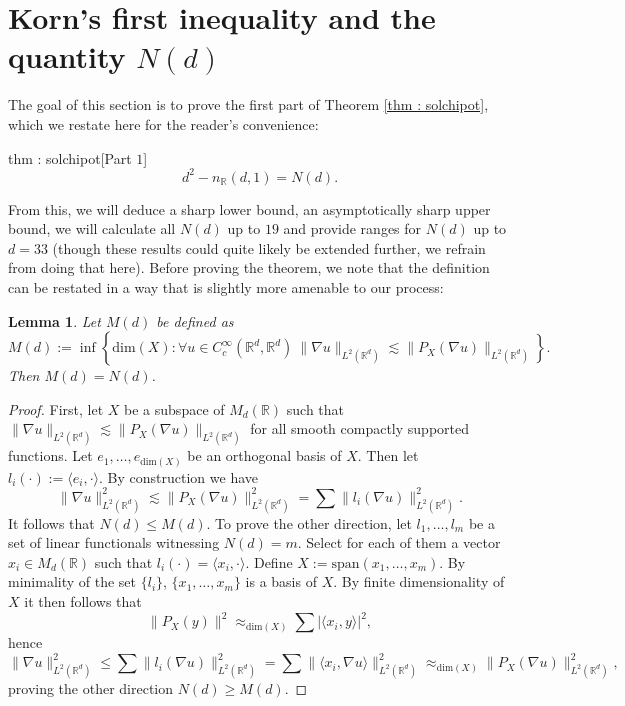 \documentclass[11pt, a4paper, reqno]{elsarticle}
\newtheorem{lemma}[theorem]{Lemma}
\theoremstyle{definition}
\theoremstyle{remark}
\begin{document}
\section{Korn's first inequality and the quantity \texorpdfstring{$N(d)$}{N(d)}}\label{sec : Chipot}
The goal of this section is to prove the first part of Theorem \ref{thm : solchipot},
which we restate here for the reader's convenience:
\begin{reptheorem}{thm : solchipot}[Part $1$]
\begin{equation}
	d^2
-
	n_{\mathbb R}(d,1)
=
	N(d).
\end{equation}
\end{reptheorem}
From this, we will deduce a sharp lower bound, an asymptotically 
sharp upper bound, we will calculate all 
$N(d)$ up to $19$ and provide ranges for $N(d)$ up to $d=33$ 
(though these results could quite likely be extended further, we
refrain from doing that here).
Before proving the theorem, we note that the
definition can be restated in a way that is slightly
more amenable to our process:
\begin{lemma}
Let $M(d)$ be defined as
\begin{equation*}
	M(d)
:=
	\inf 
	\left\{
		\mathrm{dim}(X)\colon  \forall u\in C^\infty_c(\mathbb{R}^d,\mathbb{R}^d)\  
		\|\nabla u\|_{L^2(\mathbb{R}^d)}
	\lesssim
		\| P_X(\nabla u)\|_{L^2(\mathbb{R}^d)}
	\right\}.
\end{equation*}
Then $M(d)=N(d)$.
\end{lemma}
\begin{proof}
    First, let $X$ be a subspace of $M_d(\mathbb{R})$ such that
    $\|\nabla u\|_{L^2(\mathbb{R}^d)}\lesssim \| P_X(\nabla u)\|_{L^2(\mathbb{R}^d)}$
    for all smooth compactly supported functions. Let
    $e_1,\dots, e_{\mathrm{dim}(X)}$ be an orthogonal 
    basis of $X$. Then let $l_i(\cdot):=\langle e_i, \cdot\rangle$.
By construction we have
\begin{equation*}
	\|\nabla u\|_{L^2(\mathbb{R}^d)}^2
\lesssim
	\| P_X(\nabla u)\|_{L^2(\mathbb{R}^d)}^2
=
	\sum \|l_i(\nabla u)\|_{L^2(\mathbb{R}^d)}^2.
    \end{equation*}
It follows that $N(d)\le M(d).$ To prove the other direction,
let $l_1,\dots, l_m$ be a set of linear functionals
witnessing $N(d)=m.$
Select for each of them a vector $x_i\in M_d(\mathbb{R})$
such that $l_i(\cdot)=\langle x_i,\cdot\rangle$.
Define $X:=\text{span}(x_1,\dots, x_m)$. By minimality
of the set $\{l_i\}$, $\{x_1,\dots, x_m\}$
is a basis of $X$. 
By finite dimensionality of $X$ it then follows that
\begin{equation*}
	\| P_X(y)\|^2
\approx_{\mathrm{dim}(X)}
	\sum |\langle x_i, y\rangle|^2,
\end{equation*}
hence
\begin{equation*}
	\|\nabla u\|_{L^2(\mathbb{R}^d)}^2
\le
	\sum \|l_i(\nabla u)\|_{L^2(\mathbb{R}^d)}^2
=
	\sum \|\langle x_i, \nabla u\rangle\|_{L^2(\mathbb{R}^d)}^2
\approx_{\mathrm{dim}(X)}
	\| P_X(\nabla u)\|_{L^2(\mathbb{R}^d)}^2,
\end{equation*}
proving the other direction $N(d)\ge M(d).$
\end{proof}
\end{document}
